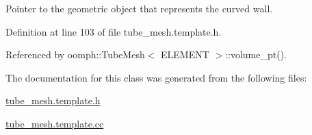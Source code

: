Pointer to the geometric object that represents the curved wall. 



Definition at line 103 of file tube\+\_\+mesh.\+template.\+h.



Referenced by oomph\+::\+Tube\+Mesh$<$ E\+L\+E\+M\+E\+N\+T $>$\+::volume\+\_\+pt().



The documentation for this class was generated from the following files\+:\begin{DoxyCompactItemize}
\item 
\hyperlink{tube__mesh_8template_8h}{tube\+\_\+mesh.\+template.\+h}\item 
\hyperlink{tube__mesh_8template_8cc}{tube\+\_\+mesh.\+template.\+cc}\end{DoxyCompactItemize}
